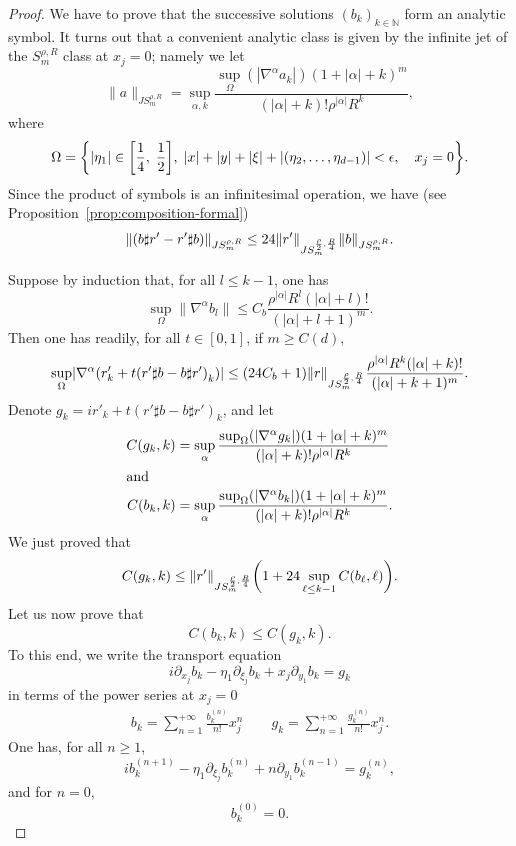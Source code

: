 \documentclass[10pt]{amsart}
\theoremstyle{definition}\newtheorem{defi}[theo]{Definition}\newtheorem{rema}[theo]{Remark}\newtheorem{exam}[theo]{Example}\newtheorem{exem}[theo]{Example}\newtheorem{nota}[theo]{Notation}
\newcommand\1{\mathds{1}}
\newcommand{\N}{\mathbb{N}}
\let\originalleft\left
\let\originalright\right
\renewcommand{\left}{\mathopen{}\mathclose\bgroup\originalleft}
\renewcommand{\right}{\aftergroup\egroup\originalright}
\begin{document}
\begin{proof}
We have to prove that the successive solutions $(b_k)_{k\in \N}$ form an analytic symbol. It turns out that a convenient analytic class is given by the infinite jet of the $S^{\rho,R}_m$ class at $x_j=0$; namely we let
\[
\|a\|_{JS^{\rho,R}_m}=\sup_{\alpha,k}\frac{\sup_\Omega(|\nabla^{\alpha}a_k|)(1+|\alpha|+k)^m}{(|\alpha|+k)!\rho^{|\alpha|}R^k},
\]
where
\[
\Omega=\left\{|\eta_{1}|\in \left[\frac 14,\; \frac 12\right],\;|x|+|y|+|\xi|+|(\eta_2,\dots,\eta_{d-1})|<\epsilon,\quad x_j=0
\right\}.
\]
Since the product of symbols is an infinitesimal operation, we have (see Proposition~\ref{prop:composition-formal})
\[
\left\|(b\sharp r'-r'\sharp b)\right\|_{JS^{\rho,R}_m}\leq 24\|r'\|_{JS^{\frac{\rho}2, \frac R4}_m}\|b\|_{JS^{\rho,R}_m}.
\]

Suppose by induction that, for all $l\leq k-1$, one has
\[
\sup_{\Omega}\|\nabla^{\alpha}b_l\|\leq C_b\frac{\rho^{|\alpha|}R^l(|\alpha|+l)!}{(|\alpha|+l+1)^m}.
\]
Then one has readily, for all $t\in [0,1]$, if $m\geq C(d)$,
\[
\sup_{\Omega}\left|\nabla^\alpha\left(r'_k+t\left(r'\sharp b - b \sharp r'\right)_k\right)\right|\leq (24C_b+1)\|r\|_{JS^{\frac{\rho}2,\frac R4}_m}\frac{\rho^{|\alpha|}R^k(|\alpha|+k)!}{(|\alpha|+k+1)^m}.
\]
Denote $g_k=ir'_k+t(r'\sharp b - b \sharp r')_k$, and let
\begin{align*}
C(g_k,k) &=\sup_{\alpha}\frac{\sup_\Omega(|\nabla^{\alpha}g_k|)(1+|\alpha|+k)^m}{(|\alpha|+k)!\rho^{|\alpha|}R^k}
\\
\intertext{and}
C(b_k,k) &=\sup_{\alpha}\frac{\sup_\Omega(|\nabla^{\alpha}b_k|)(1+|\alpha|+k)^m}{(|\alpha|+k)!\rho^{|\alpha|}R^k}.
\end{align*}
We just proved that
\[
C(g_k,k)\leq \|r'\|_{JS^{\frac{\rho}2, \frac R4}_m}\left(1+24\sup_{ \ell
\leq k-1}C(b_\ell,\ell)\right).
\]
Let us now prove that
\[
C(b_k,k)\leq C(g_k,k).
\]
To this end, we write the transport equation
\[
i\partial_{x_j}b_k-\eta_{1}\partial_{\xi_j}b_k+x_j
\partial_{y_{1}}b_k=g_k
\]
in terms of the power series at $x_j=0$
\begin{align*}
b_k=\sum_{n=1}^{+\infty} \frac{b_k^{(n)}}{n!}x_j^n  \qquad g_k=\sum_{n=1}^{+\infty}
\frac{g_k^{(n)}}{n!}x_j^n.
\end{align*}
One has, for all $n\geq 1$,
\begin{equation}\label{eq:transport}
ib_{k}^{(n+1)}-\eta_{1}\partial_{\xi_j}b_{k}^{(n)}+n\partial_{y_{1}}b_{k}^{(n-1)}=g_k^{(n)},
\end{equation}
and for $n=0$,
\[
b_{k}^{(0)}=0.
\]


\end{proof}
\end{document}
